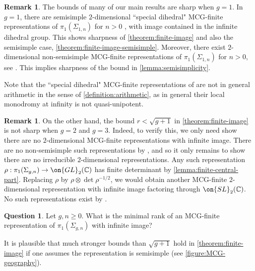 \documentclass[12 pt]{amsart}
\theoremstyle{plain}
\theoremstyle{definition}
\newtheorem{remark}[subsubsection]{Remark}
\newtheorem{question}[subsubsection]{Question}
\theoremstyle{remark}
\numberwithin{equation}{section}
\begin{document}
\begin{remark}
	\label{remark:sharp-g-1}
	The bounds of many of our main results are sharp when $g=1$. 
In $g = 1$, there are semisimple $2$-dimensional ``special dihedral" MCG-finite representations
of $\pi_1(\Sigma_{1,n})$ for $n > 0$
\cite[Theorem B]{biswas2017surface},
with image contained in the infinite dihedral group.
This shows sharpness of \autoref{theorem:finite-image} and also the semisimple
case, \autoref{theorem:finite-image-semisimple}.
Moreover, there exist $2$-dimensional non-semisimple MCG-finite representations of $\pi_1(\Sigma_{1,n})$ for $n>0$, see \cite[Theorem B]{CH:isomonodromic}.
This implies sharpness of the bound in \autoref{lemma:semisimplicity}.

Note that the ``special dihedral" MCG-finite representations of \cite[Theorem B]{biswas2017surface} are not in general arithmetic in the sense of \autoref{definition:arithmetic}, as in general their local monodromy at infinity is not quasi-unipotent.
\end{remark}
\begin{remark}
	\label{remark:not-sharp-g-2-3}
	On the other hand, the bound $r < \sqrt{g+1}$ in \autoref{theorem:finite-image} is not sharp when $g =
	2$ and $g =3$.
	Indeed, to verify this, we only need show there are no $2$-dimensional
	MCG-finite representations with infinite image. There are no non-semisimple such
	representations by \cite[Theorem B]{CH:isomonodromic}, and so it only
	remains to show there are no irreducible $2$-dimensional
	representations.
	Any such representation $\rho: \pi_1(\Sigma_{g,n}) \to \on{GL}_2(\mathbb
	C)$ has finite determinant by \autoref{lemma:finite-central-part}.
	Replacing $\rho$ by $\rho \otimes \det \rho^{-1/2}$, we would obtain another
	MCG-finite $2$-dimensional representation with infinite image factoring
	through $\on{SL}_2(\mathbb C)$.
	No such representations	exist by \cite[Theorem A]{biswas2017surface}.
\end{remark}


\begin{question}
Let $g, n\geq 0$. What is the minimal rank of an MCG-finite representation of $\pi_1(\Sigma_{g,n})$ with infinite image?
\end{question}

	It is plausible that much stronger bounds 
than $\sqrt{g+1}$ hold in \autoref{theorem:finite-image}
if one assumes the representation is semisimple (see \autoref{figure:MCG-geography}).
\end{document}
